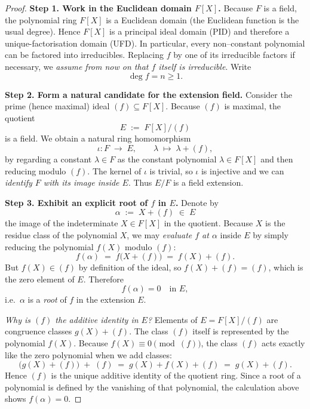 \documentclass[12pt]{article}
\theoremstyle{definition} %
\theoremstyle{plain} %
\begin{document}
  \begin{proof}
  \textbf{Step 1.  Work in the Euclidean domain \(F[X]\).}  
  Because \(F\) is a field, the polynomial ring \(F[X]\) is a Euclidean
  domain (the Euclidean function is the usual degree).  Hence \(F[X]\) is
  a principal ideal domain (PID) and therefore a unique-factorisation
  domain (UFD).  In particular, every non–constant polynomial can be
  factored into irreducibles.  Replacing \(f\) by one of its irreducible
  factors if necessary, we \emph{assume from now on that \(f\) itself is
  irreducible}.  Write
  \[
     \deg f = n\ge 1 .
  \]
  
  \textbf{Step 2.  Form a natural candidate for the extension field.}  
  Consider the prime (hence maximal) ideal \((f)\subseteq F[X]\).
  Because \((f)\) is maximal, the quotient
  \[
     E \;:=\; F[X]\big/ (f)
  \]
  is a field.  We obtain a natural ring homomorphism
  \[
     \iota: F \;\longrightarrow\; E, \qquad
     \lambda \;\longmapsto\; \lambda + (f),
  \]
  by regarding a constant \(\lambda\in F\) as the constant polynomial
  \(\lambda\in F[X]\) and then reducing modulo \((f)\).
  The kernel of \(\iota\) is trivial, so \(\iota\) is injective and we can
  \emph{identify \(F\) with its image inside \(E\)}.  Thus \(E/F\) is a
  field extension.
  
  \textbf{Step 3.  Exhibit an explicit root of \(f\) in \(E\).}  
  Denote by
  \[
     \alpha \;:=\; X + (f) \;\in\; E
  \]
  the image of the indeterminate \(X\in F[X]\) in the quotient.
  Because \(X\) is the residue class of the polynomial \(X\),
  we may \emph{evaluate \(f\) at \(\alpha\)} inside \(E\) by simply
  reducing the polynomial \(f(X)\) modulo \((f)\):
  \[
     f(\alpha)
     \;=\;
     f\bigl(X+(f)\bigr)
     \;=\;
     f(X) + (f).
  \]
  But \(f(X)\in (f)\) by definition of the ideal, so
  \(f(X) + (f) = (f)\), which is the zero element of \(E\).
  Therefore
  \[
     f(\alpha)=0 \quad\text{in }E,
  \]
  i.e.\ \(\alpha\) is a \emph{root} of \(f\) in the extension \(E\).
  
  \medskip
  \emph{Why is \((f)\) the additive identity in \(E\)?}  
  Elements of \(E=F[X]/(f)\) are congruence classes \(g(X)+(f)\).
  The class \((f)\) itself is represented by the polynomial \(f(X)\).  
  Because \(f(X)\equiv 0 \pmod{(f)}\), the class \((f)\) acts exactly like
  the zero polynomial when we add classes:
  \[
     \bigl(g(X)+(f)\bigr) \;+\; (f) 
     \;=\; g(X) + f(X) + (f) 
     \;=\; g(X) + (f).
  \]
  Hence \((f)\) is the unique additive identity of the quotient ring.
  Since a root of a polynomial is defined by the vanishing of that
  polynomial, the calculation above shows \(f(\alpha)=0\).
  

\end{proof}
\end{document}
